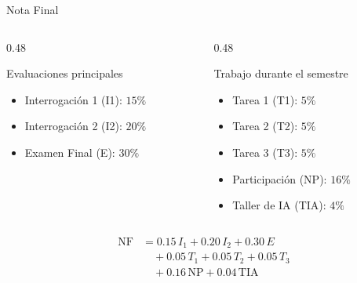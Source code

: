 \documentclass{beamer}
\begin{document}
    \begin{frame}{Nota Final}

        \begin{columns}[T]
        
        \begin{column}{0.48\textwidth}
        \begin{block}{Evaluaciones principales}
        \begin{itemize}
            \item Interrogación 1 (I1): $15\%$
            \item Interrogación 2 (I2): $20\%$
            \item Examen Final (E): $30\%$
        \end{itemize}
        \end{block}
        \end{column}
        
        \begin{column}{0.48\textwidth}
        \begin{block}{Trabajo durante el semestre}
        \begin{itemize}
            \item Tarea 1 (T1): $5\%$
            \item Tarea 2 (T2): $5\%$
            \item Tarea 3 (T3): $5\%$
            \item Participación (NP): $16\%$
            \item Taller de IA (TIA): $4\%$
        \end{itemize}
        \end{block}
        \end{column}
        
        \end{columns}
        
        \vspace{0.3cm}

        \[
        \begin{aligned}
        \mathrm{NF} &= 0.15\,I_{1} + 0.20\,I_{2} + 0.30\,E \\
                    &\quad + 0.05\,T_{1} + 0.05\,T_{2} + 0.05\,T_{3} \\
                    &\quad + 0.16\,\mathrm{NP} + 0.04\,\mathrm{TIA}
        \end{aligned}
        \]
        
    \end{frame}
\end{document}
